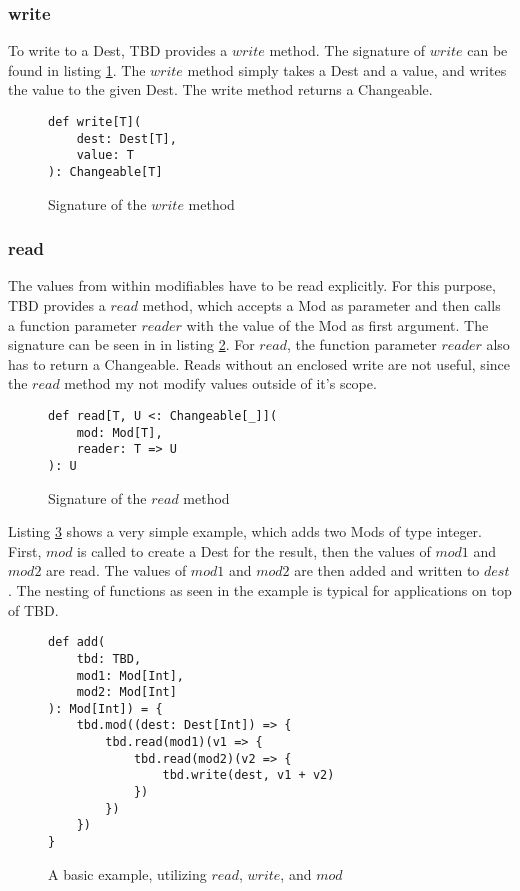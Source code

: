 \subsubsection{write}
To write to a Dest, TBD provides a $write$ method. The signature of $write$ can be found in listing \ref{code:write}. The $write$ method simply takes a Dest and a value, and writes the value to the given Dest. The write method returns a Changeable. 

\begin{figure}
\begin{lstlisting}[frame=single,basicstyle=\ttfamily]
def write[T](
    dest: Dest[T], 
    value: T
): Changeable[T]
\end{lstlisting}
\caption{Signature of the $write$ method}
\label{code:write}
\end{figure}

\subsubsection{read}
The values from within modifiables have to be read explicitly. For this purpose, TBD provides a $read$ method, which accepts a Mod as parameter and then calls a function parameter $reader$ with the value of the Mod as first argument. The signature can be seen in in listing \ref{code:read}. For $read$, the function parameter $reader$ also has to return a Changeable. Reads without an enclosed write are not useful, since the $read$ method my not modify values outside of it's scope.  

\begin{figure}
\begin{lstlisting}[frame=single,basicstyle=\ttfamily]
def read[T, U <: Changeable[_]](
    mod: Mod[T], 
    reader: T => U
): U
\end{lstlisting}
\caption{Signature of the $read$ method}
\label{code:read}
\end{figure}

Listing \ref{code:simpleExample} shows a very simple example, which adds two Mods of type integer. First, $mod$ is called to create a Dest for the result, then the values of $mod1$ and $mod2$ are read. The values of $mod1$ and $mod2$ are then added and written to $dest$. The nesting of functions as seen in the example is typical for applications on top of TBD. 

\begin{figure}
\begin{lstlisting}[frame=single,basicstyle=\ttfamily]
def add(
    tbd: TBD, 
    mod1: Mod[Int], 
    mod2: Mod[Int]
): Mod[Int]) = {
    tbd.mod((dest: Dest[Int]) => {
        tbd.read(mod1)(v1 => {
            tbd.read(mod2)(v2 => {
                tbd.write(dest, v1 + v2)
            })
        })
    })
}
\end{lstlisting}
\caption{A basic example, utilizing $read$, $write$, and $mod$}
\label{code:simpleExample}
\end{figure}

